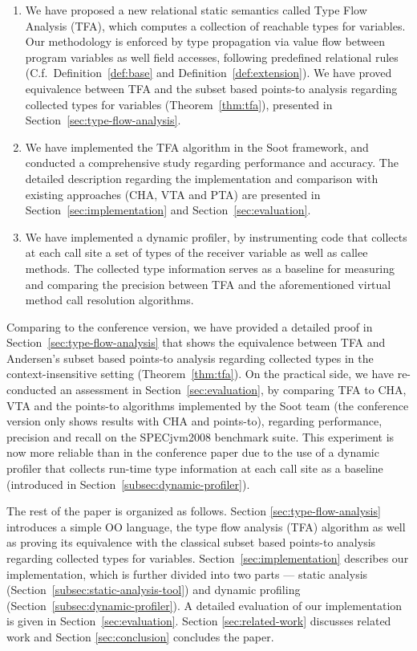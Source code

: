 \documentclass{fac}
\begin{document}
\begin{enumerate}
  \item We have proposed a new relational static semantics called Type Flow Analysis (TFA), which computes a collection of reachable types for variables. Our methodology is enforced by type propagation via value flow between program variables as well field accesses, following predefined relational rules (C.f.~Definition~\ref{def:base} and Definition~\ref{def:extension}). We have proved equivalence between TFA and the subset based points-to analysis regarding collected types for variables (Theorem~\ref{thm:tfa}), presented in Section~\ref{sec:type-flow-analysis}.
  \item We have implemented the TFA algorithm in the Soot framework, and conducted a comprehensive study regarding performance and accuracy. The detailed description regarding the implementation and comparison with existing approaches (CHA, VTA and PTA) are presented in Section~\ref{sec:implementation} and Section~\ref{sec:evaluation}.
  \item %
  We have implemented a dynamic profiler, by instrumenting code that collects at each call site a set of types of the receiver variable as well as callee methods. The collected type information serves as a baseline for measuring and comparing the precision between TFA and the aforementioned virtual method call resolution algorithms.
\end{enumerate}

Comparing to the conference version, we have provided a detailed proof in Section~\ref{sec:type-flow-analysis} that shows the equivalence between TFA and Andersen's subset based points-to analysis regarding collected types in the context-insensitive setting (Theorem~\ref{thm:tfa}). On the practical side, we have re-conducted an assessment in Section~\ref{sec:evaluation}, by comparing TFA to CHA, VTA and the points-to algorithms implemented by the Soot team (the conference version only shows results with CHA and points-to), regarding performance, precision and recall on the SPECjvm2008 benchmark suite. This experiment is now more reliable than in the conference paper due to the use of a dynamic profiler that collects run-time type information at each call site as a baseline (introduced in Section~\ref{subsec:dynamic-profiler}).

The rest of the paper is organized as follows. Section \ref{sec:type-flow-analysis} introduces a simple OO language, the type flow analysis (TFA) algorithm as well as proving its equivalence with the classical subset based points-to analysis regarding collected types for variables. Section~\ref{sec:implementation} describes our implementation, which is further divided into two parts --- static analysis (Section~\ref{subsec:static-analysis-tool}) and dynamic profiling (Section~\ref{subsec:dynamic-profiler}). A detailed evaluation of our implementation is given in Section~\ref{sec:evaluation}.
Section \ref{sec:related-work} discusses related work and Section \ref{sec:conclusion} concludes the paper.
%
\end{document}
